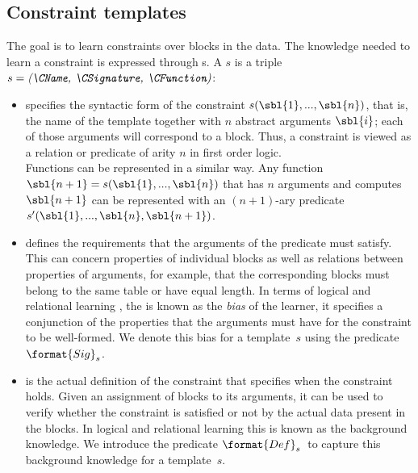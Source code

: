 \newcommand{\sigc}{\ensuremath{\format{Sig}_s}}
\newcommand{\defc}{\ensuremath{\format{Def}_s}}

\subsection{Constraint templates}
The goal is to learn constraints over blocks in the data. The knowledge needed to learn a constraint is expressed through {\template}s.
%
A \template $s$ is a triple $s = \textit{(\CName, \CSignature, \CFunction)}$:
\begin{itemize}
\item
\textit{\CName}  specifies the syntactic form of the constraint $s(\sbl{1}, ...,\sbl{n})$, that is, the name of the template together
with $n$ abstract arguments $\sbl{i}$; each of those arguments will correspond to a block.
Thus, a constraint is viewed as a relation or predicate of arity $n$ in first order logic.\\
Functions can be represented in a similar way. Any function $\sbl{n+1}=s(\sbl{1},...,\sbl{n})$ that has $n$ arguments and computes $\sbl{n+1}$ can be represented with an $(n{+}1)$-ary predicate $s'(\sbl{1},...,\sbl{n},\sbl{n+1})$.

\item \textit{\CSignature} defines the requirements that the arguments of the predicate must satisfy.
This can concern properties of individual blocks as well as relations between properties of arguments, for example, that the corresponding blocks must belong to the same table or have equal length.
In terms of logical and relational learning \parencite{luc_book}, the \CSignature is known as the {\em bias} of the learner, it specifies a conjunction of the properties that the arguments must have for the constraint to be well-formed.
We denote this bias for a template~$s$ using the predicate $\sigc$.
\item \textit{\CFunction} is the actual definition of the constraint that specifies when the constraint holds.
Given an assignment of blocks to its arguments, it can be used to verify whether the constraint is satisfied or not by the actual data present in the blocks. %
In logical and relational learning this is known as the background knowledge.
We introduce the predicate \defc~to capture this background knowledge for a template~$s$.
\end{itemize}

